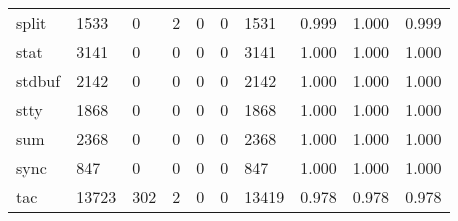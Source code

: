 \begin{longtable}{lp{2.0cm}p{2.0cm}p{2.0cm}p{2.0cm}p{2.0cm}p{2.0cm}p{2.0cm}p{2.0cm}p{2.0cm}}
split     &                   1533 &                                  0 &                                 2 &                                0 &                                 0 &                            1531 &                                   0.999 &                                  1.000 &                                0.999 \\
stat      &                   3141 &                                  0 &                                 0 &                                0 &                                 0 &                            3141 &                                   1.000 &                                  1.000 &                                1.000 \\
stdbuf    &                   2142 &                                  0 &                                 0 &                                0 &                                 0 &                            2142 &                                   1.000 &                                  1.000 &                                1.000 \\
stty      &                   1868 &                                  0 &                                 0 &                                0 &                                 0 &                            1868 &                                   1.000 &                                  1.000 &                                1.000 \\
sum       &                   2368 &                                  0 &                                 0 &                                0 &                                 0 &                            2368 &                                   1.000 &                                  1.000 &                                1.000 \\
sync      &                    847 &                                  0 &                                 0 &                                0 &                                 0 &                             847 &                                   1.000 &                                  1.000 &                                1.000 \\
tac       &                  13723 &                                302 &                                 2 &                                0 &                                 0 &                           13419 &                                   0.978 &                                  0.978 &                                0.978 \\

\end{longtable}
